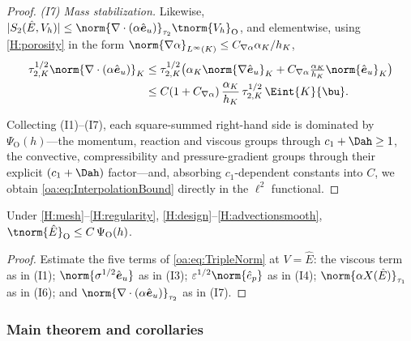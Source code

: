 \begin{proof}
\smallskip\noindent
\emph{(I7) Mass stabilization.} Likewise,
$|S_2(\hat E, V_h)| \le
\norm{\nabla\cdot(\alpha\hat{\boldsymbol e}_u)}_{\tau_2}\tnorm{V_h}_{\mathrm{O}}$, and elementwise,
using \cref{H:porosity} in the form $\norm{\nabla\alpha}_{L^\infty(K)} \le C_{\nabla\alpha}\alpha_K/h_K$,
\[
\begin{aligned}
  \tau_{2,K}^{1/2}\norm{\nabla\cdot(\alpha\hat{\boldsymbol e}_u)}_K
  &\le \tau_{2,K}^{1/2}\bigl( \alpha_K \norm{\nabla\hat{\boldsymbol e}_u}_K
  + C_{\nabla\alpha}\tfrac{\alpha_K}{h_K}\norm{\hat{\boldsymbol e}_u}_K \bigr) \\
  &\le C(1+C_{\nabla\alpha})\,\frac{\alpha_K}{h_K}\,\tau_{2,K}^{1/2}\,\Eint{K}{\bu}.
\end{aligned}
\]

Collecting (I1)--(I7), each square-summed right-hand side is dominated by
$\Psi_{\mathrm O}(h)$---the momentum, reaction and viscous groups through
$c_1+\Dah \ge 1$, the convective, compressibility and pressure-gradient groups through their explicit
$(c_1+\Dah)$ factor---and, absorbing $c_1$-dependent constants into $C$, we obtain
\cref{oa:eq:InterpolationBound} directly in the $\ell^2$ functional.
\end{proof}

\begin{lemma}
\label{oa:lem:interpsize}
Under \cref{H:mesh}--\cref{H:regularity}, \cref{H:design}--\cref{H:advectionsmooth},
$\tnorm{\hat E}_{\mathrm{O}} \le C\,\Psi_{\mathrm O}(h)$.
\end{lemma}

\begin{proof}
Estimate the five terms of \cref{oa:eq:TripleNorm} at $V = \hat E$: the viscous term as
in (I1); $\norm{\sigma^{1/2}\hat{\boldsymbol e}_u}$ as in (I3);
$\varepsilon^{1/2}\norm{\hat e_p}$ as in (I4);
$\norm{\alpha X(\hat E)}_{\tau_1}$ as in (I6); and
$\norm{\nabla\cdot(\alpha\hat{\boldsymbol e}_u)}_{\tau_2}$ as in (I7).
\end{proof}

\subsubsection{Main theorem and corollaries}


